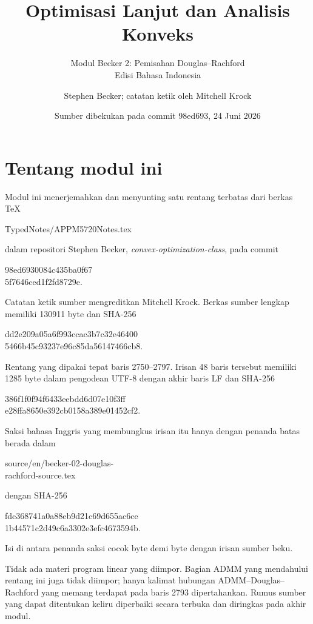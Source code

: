 \documentclass[indonesian]{shinybook}
\title{Optimisasi Lanjut dan Analisis Konveks}
\subtitle{Modul Becker 2: Pemisahan Douglas--Rachford\\Edisi Bahasa Indonesia}
\author{Stephen Becker; catatan ketik oleh Mitchell Krock}
\date{Sumber dibekukan pada commit 98ed693, 24 Juni 2026}
\begin{document}
\maketitle

\frontmatter
\chapter*{Tentang modul ini}
Modul ini menerjemahkan dan menyunting satu rentang terbatas dari berkas TeX
\begin{center}\small\ttfamily
TypedNotes/APPM5720Notes.tex
\end{center}
dalam repositori Stephen Becker, \emph{convex-optimization-class}, pada commit
\begin{center}\small\ttfamily
98ed6930084c435ba0f67\\[-0.2em]
5f7646ced1f2fd8729e.
\end{center}
Catatan ketik sumber mengreditkan Mitchell Krock. Berkas sumber lengkap
memiliki 130911 byte dan SHA-256
\begin{center}\small\ttfamily
dd2e209a05a6f993ccac3b7c32e46400\\[-0.2em]
5466b45c93237e96c85da56147466cb8.
\end{center}

Rentang yang dipakai tepat baris 2750--2797. Irisan 48 baris tersebut memiliki
1285 byte dalam pengodean UTF-8 dengan akhir baris LF dan SHA-256
\begin{center}\small\ttfamily
386f1f0f94f6433eebdd6d07e10f3ff\\[-0.2em]
e28ffa8650e392cb0158a389e01452cf2.
\end{center}
Saksi bahasa Inggris yang membungkus irisan itu hanya dengan penanda batas
berada dalam
\begin{center}\small\ttfamily
source/en/becker-02-douglas-\\[-0.2em]
rachford-source.tex
\end{center}
dengan SHA-256
\begin{center}\small\ttfamily
fdc368741a0a88eb9d21c69d655ac6ce\\[-0.2em]
1b44571c2d49c6a3302e3efc4673594b.
\end{center}
Isi di antara penanda saksi cocok byte demi byte dengan irisan sumber beku.

Tidak ada materi program linear yang diimpor. Bagian ADMM yang mendahului
rentang ini juga tidak diimpor; hanya kalimat hubungan ADMM--Douglas--Rachford
yang memang terdapat pada baris 2793 dipertahankan. Rumus sumber yang dapat
ditentukan keliru diperbaiki secara terbuka dan diringkas pada akhir modul.
\end{document}
